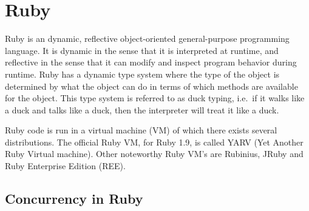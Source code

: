 \section{Ruby} %
\label{sec:ruby}

Ruby is an dynamic, reflective object-oriented general-purpose programming language. It is dynamic in the sense that it is interpreted at runtime, and reflective in the sense that it can modify and inspect program behavior during runtime. 
Ruby has a dynamic type system where the type of the object is determined by what the object can do in terms of which methods are available for the object. 
This type system is referred to as duck typing, i.e.\ if it walks like a duck and talks like a duck, then the interpreter will treat it like a duck.

Ruby code is run in a virtual machine (VM) of which there exists several distributions. 
The official Ruby VM, for Ruby 1.9, is called YARV (Yet Another Ruby Virtual machine).
Other noteworthy Ruby VM's are Rubinius, JRuby and Ruby Enterprise Edition (REE).


\subsection{Concurrency in Ruby}



